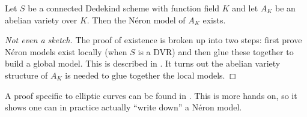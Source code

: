 \documentclass[11pt]{article}
\newcommand{\neron}{N\'{e}ron }
\begin{document}
\begin{thm}\label{neronmodelsforav}
	Let $S$ be a connected Dedekind scheme with function field $K$ and let $A_K$ be an abelian variety over $K$. Then the \neron model of $A_K$ exists.
\end{thm}
\begin{proof}[Not even a sketch]
	The proof of existence is broken up into two steps: first prove \neron models exist locally (when $S$ is a DVR) and then glue these together to build a global model. This is described in \cite[Sec.~1.3,1.4]{bosch2012neron}. It turns out the abelian variety structure of $A_K$ is needed to glue together the local models.
\end{proof}

A proof specific to elliptic curves can be found in \cite[Thm.~IV.6.1]{silverman1994advanced}. This is more hands on, so it shows one can in practice actually ``write down'' a \neron model.
\end{document}
